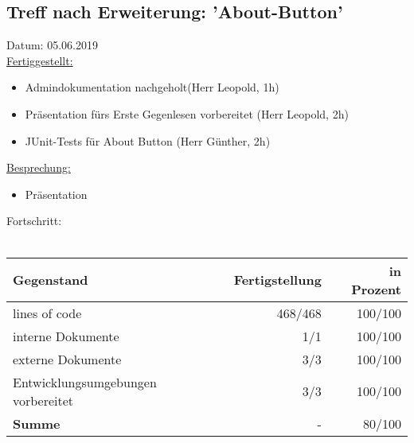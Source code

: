 \documentclass[12pt]{article}
\begin{document}
\newpage
\subsection{Treff nach Erweiterung: 'About-Button'}
Datum: 05.06.2019 \\

\uline{Fertiggestellt:}
\begin{itemize}\itemsep0em
\item Admindokumentation nachgeholt(Herr Leopold, 1h)
\item Präsentation fürs Erste Gegenlesen vorbereitet (Herr Leopold, 2h)
\item JUnit-Tests für About Button (Herr Günther, 2h)
\end{itemize}

\uline{Besprechung:}
\begin{itemize}\itemsep0em
\item Präsentation
\end{itemize}

Fortschritt:\\\\
\begin{tabularx}{\textwidth}{|X|r|r|} \hline
\textbf{Gegenstand}&\textbf{Fertigstellung} & \textbf{in Prozent}\\ \hline
lines of code & 468/468  & 100/100\\ \hline
interne Dokumente & 1/1 & 100/100  \\ \hline
externe Dokumente & 3/3 & 100/100 \\ \hline
Entwicklungsumgebungen vorbereitet & 3/3 & 100/100 \\ \hline
\textbf{Summe} & - & 80/100  \\ \hline
\end{tabularx}\\\\




\clearpage
\end{document}
